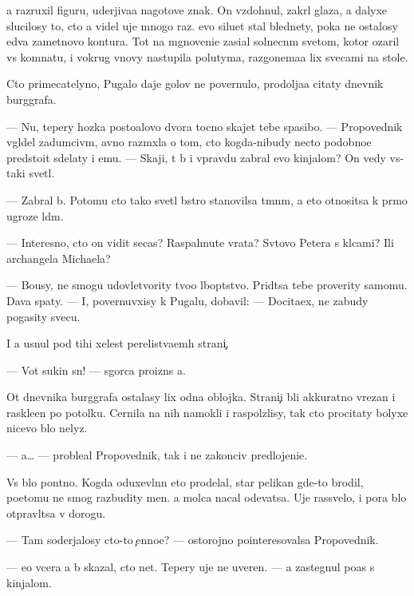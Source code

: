 \documentclass[10pt]{book}
\begin{document}
{\Y}a razruxil figuru, uderjiva{\y}a nagotove znak. On vzdohnul, zakr{\yi}l glaza, a dalyxe slucilosy to, cto {\y}a videl uje mnogo raz. {\Y}evo siluet stal blednety, poka ne ostalosy {\y}edva zametnovo kontura. Tot na mgnoveni{\y}e zasi{\y}al solnecn{\yi}m svetom, kotor{\yi}{\y} ozaril vs{\io} komnatu, i vokrug vnovy nastupila polutyma, razgon{\ia}{\y}ema{\y}a lix svecami na stole.

Cto primecatelyno, Pugalo daje golov{\yi} ne povernulo, prodolja{\y}a citaty dnevnik burggrafa.

— Nu, tepery hoz{\ia}{\y}ka posto{\y}alovo dvora tocno skajet tebe spasibo. — Pro\-po\-ved\-nik v{\yi}gl{\ia}del zadumciv{\yi}m, {\y}avno razm{\yi}xl{\ia}{\y}a o tom, cto kogda-nibudy necto po\-dob\-no\-{\y}e predsto{\y}it sdelaty i {\y}emu. — Skaji, t{\yi} b{\yi} i vpravdu zabral {\y}evo kinjalom? On vedy vs{\e}-taki svetl{\yi}{\y}.

— Zabral b{\yi}. Potomu cto tako{\y} svetl{\yi}{\y} b{\yi}stro stanovilsa t{\e}mn{\yi}m, a eto otnositsa k pr{\ia}mo{\y} ugroze l{\io}d{\ia}m.

— Interesno, cto on vidit se{\y}cas? Raspahnut{\yi}{\y}e vra\-ta? Sv{\ia}tovo Petera s kl{\io}cami? Ili archangela Michaela?

— Bo{\y}usy, ne smogu udovletvority tvo{\y}o l{\io}bop{\yi}tstvo. Prid{\e}tsa tebe proverity samomu. Dava{\y} spaty. — I, povernuvxisy k Pugalu, dobavil: — Docita{\y}ex, ne zabudy pogasity svecu.

I {\y}a usnul pod tihi{\y} xelest perelist{\yi}va{\y}em{\yi}h strani{\c}.

— Vot sukin s{\yi}n! — sgor{\ia}ca proizn{\e}s {\y}a.

Ot dnevnika burggrafa ostalasy lix odna oblojka. Strani{\c}i b{\yi}li akkuratno v{\yi}\-re\-za\-n{\yi} i raskle{\y}en{\yi} po potolku. Cernila na nih namokli i raspolzlisy, tak cto procitaty bolyxe nicevo b{\yi}lo nelyz{\ia}.

— {\Y}a… — proble{\y}al Pro\-po\-ved\-nik, tak i ne zakonciv predlojeni{\y}e.

Vs{\e} b{\yi}lo pon{\ia}tno. Kogda oduxevl{\e}nn{\yi}{\y} eto prodelal, star{\yi}{\y} pelikan gde-to brodil, poetomu ne smog razbudity men{\ia}. {\Y}a molca nacal odevatsa. Uje rassvelo, i pora b{\yi}lo otpravl{\ia}tsa v do\-ro\-gu.

— Tam soderjalosy cto-to {\c}enno{\y}e? — ostorojno pointeresovalsa Pro\-po\-ved\-nik.

— {\Y}e{\x}o vcera {\y}a b{\yi} skazal, cto net. Tepery uje ne uveren. — {\Y}a zastegnul po{\y}as s kinjalom.
\end{document}
